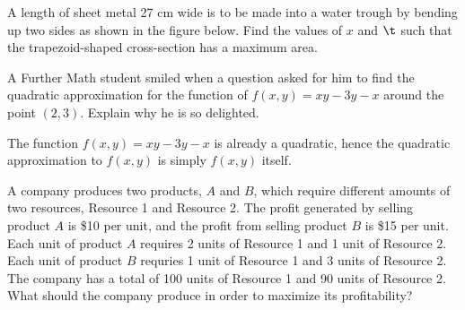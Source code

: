 \begin{problem}
    A length of sheet metal 27 cm wide is to be made into a water trough by bending up two sides as shown in the figure below. Find the values of $x$ and $\t$ such that the trapezoid-shaped cross-section has a maximum area.

    \begin{center}
    \end{center}
\end{problem}

\begin{problem}
    A Further Math student smiled when a question asked for him to find the quadratic approximation for the function of $f(x, y) = xy - 3y - x$ around the point $(2, 3)$. Explain why he is so delighted.
\end{problem}
\begin{solution}
    The function $f(x, y) = xy - 3y - x$ is already a quadratic, hence the quadratic approximation to $f(x, y)$ is simply $f(x, y)$ itself.
\end{solution}

\begin{problem}
    A company produces two products, $A$ and $B$, which require different amounts of two resources, Resource 1 and Resource 2. The profit generated by selling product $A$ is \$10 per unit, and the profit from selling product $B$ is \$15 per unit. Each unit of product $A$ requires 2 units of Resource 1 and 1 unit of Resource 2. Each unit of product $B$ requries 1 unit of Resource 1 and 3 units of Resource 2. The company has a total of 100 units of Resource 1 and 90 units of Resource 2. What should the company produce in order to maximize its profitability?
\end{problem}
